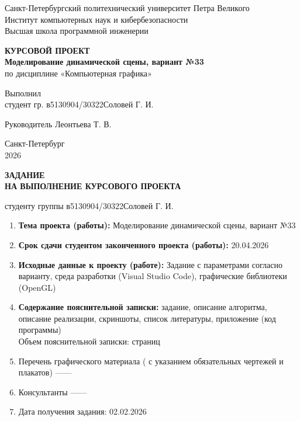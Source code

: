\documentclass[a4paper,12pt]{article}
\newcommand{\University}{Санкт-Петербургский политехнический университет Петра Великого}
\newcommand{\Institute}{Институт компьютерных наук и кибербезопасности}
\newcommand{\School}{Высшая школа программной инженерии}
\newcommand{\WorkType}{КУРСОВОЙ ПРОЕКТ}
\newcommand{\Topic}{Моделирование динамической сцены}
\newcommand{\Variant}{33}
\newcommand{\Discipline}{Компьютерная графика}
\newcommand{\Group}{в5130904/30322}
\newcommand{\StudentName}{Соловей Г. И.}
\newcommand{\SupervisorName}{Леонтьева Т. В.}
\newcommand{\City}{Санкт-Петербург}
\newcommand{\Year}{2026}
\newcommand{\StartDate}{02.02.2026}
\newcommand{\Software}{Visual Studio Code}
\newcommand{\Libraries}{OpenGL}
\begin{document}
\begin{center}
    {\small \University}\\
    {\small \Institute}\\
    {\small \School}

    \vspace{4cm}

    {\large \textbf{\WorkType}}\\[1cm]

    {\textbf{\Topic, вариант №\Variant}}\\

    по дисциплине «\Discipline»

    \vspace{3cm}
\end{center}

\begin{flushleft}
    Выполнил\\
    студент гр. \Group \hfill \StudentName

    \vspace{1cm}

    Руководитель \hfill \SupervisorName
\end{flushleft}

\vfill

\begin{center}
    \City\\
    \Year
\end{center}

\thispagestyle{empty}

\newpage

\begin{center}
    \textbf{ЗАДАНИЕ \\ НА ВЫПОЛНЕНИЕ КУРСОВОГО ПРОЕКТА}

\end{center}
студенту группы \Group \hfill \StudentName

\vspace{0.5cm}

\begin{enumerate}
    \item \textbf{Тема проекта (работы):} \Topic, вариант №\Variant
    \item \textbf{Срок сдачи студентом законченного проекта (работы):} \hfill 20.04.2026
    \item \textbf{Исходные данные к проекту (работе):} Задание с параметрами согласно варианту, среда разработки (\Software),
          графические библиотеки (\Libraries)
    \item \textbf{Содержание пояснительной записки:}
          задание,
          описание алгоритма,
          описание реализации,
          скриншоты,
          список литературы,
          приложение (код программы) \\
          Объем пояснительной записки: \pageref{LastPage} страниц
    \item Перечень графического материала ( с указанием обязательных чертежей и
          плакатов)	------
    \item Консультанты ------
    \item Дата получения задания: \StartDate
\end{enumerate}
\end{document}
